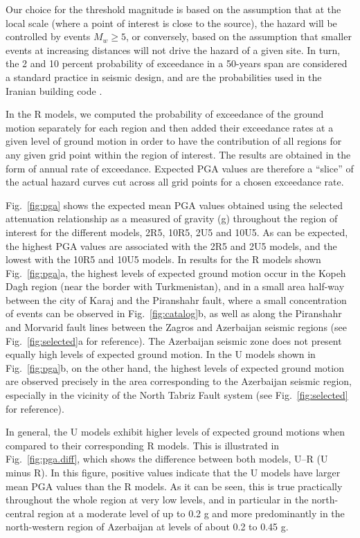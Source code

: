 Our choice for the threshold magnitude is based on the assumption that at the local scale (where a point of interest is close to the source), the hazard will be controlled by events $M_w \geq 5$, or conversely, based on the assumption that smaller events at increasing distances will not drive the hazard of a given site. In turn, the 2 and 10 percent probability of exceedance in a 50-years span are considered a standard practice in seismic design, and are the probabilities used in the Iranian building code \citep{BHRC2014}.

In the R models, we computed the probability of exceedance of the ground motion separately for each region and then added their exceedance rates at a given level of ground motion in order to have the contribution of all regions for any given grid point within the region of interest. The results are obtained in the form of annual rate of exceedance. Expected PGA values are therefore a ``slice'' of the actual hazard curves cut across all grid points for a chosen exceedance rate.

Fig.~\ref{fig:pga} shows the expected mean PGA values obtained using the selected attenuation relationship as a measured of gravity (g) throughout the region of interest for the different models, 2R5, 10R5, 2U5 and 10U5. As can be expected, the highest PGA values are associated with the 2R5 and 2U5 models, and the lowest with the 10R5 and 10U5 models. In results for the R models shown Fig.~\ref{fig:pga}a, the highest levels of expected ground motion occur in the Kopeh Dagh region (near the border with Turkmenistan), and in a small area half-way between the city of Karaj and the Piranshahr fault, where a small concentration of events can be observed in Fig.~\ref{fig:catalog}b, as well as along the Piranshahr and Morvarid fault lines between the Zagros and Azerbaijan seismic regions (see Fig.~\ref{fig:selected}a for reference). The Azerbaijan seismic zone does not present equally high levels of expected ground motion. In the U models shown in Fig.~\ref{fig:pga}b, on the other hand, the highest levels of expected ground motion are observed precisely in the area corresponding to the Azerbaijan seismic region, especially in the vicinity of the North Tabriz Fault system (see Fig.~\ref{fig:selected} for reference).

In general, the U models exhibit higher levels of expected ground motions when compared to their corresponding R models. This is illustrated in Fig.~\ref{fig:pga.diff}, which shows the difference between both models, U--R (U minus R). In this figure, positive values indicate that the U models have larger mean PGA values than the R models. As it can be seen, this is true practically throughout the whole region at very low levels, and in particular in the north-central region at a moderate level of up to 0.2 g and more predominantly in the north-western region of Azerbaijan at levels of about 0.2 to 0.45 g.

